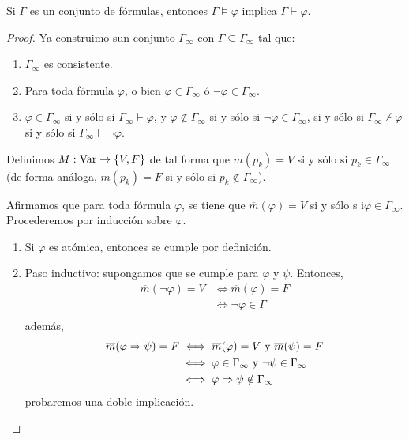 \documentclass[12pt]{report}
\theoremstyle{largebreak}
\newcommand\cf[3]{\ensuremath{#1:#2\rightarrow#3}}
\begin{document}
    \begin{cor}
        Si $\Gamma$ es un conjunto de fórmulas, entonces $\Gamma\vDash\varphi$ implica $\Gamma\vdash\varphi$. 
    \end{cor}

    \begin{proof}
        
        Ya construimo sun conjunto $\Gamma_\infty$ con $\Gamma\subseteq\Gamma_\infty$ tal que:
        \begin{enumerate}
            \item $\Gamma_\infty$ es consistente.
            \item Para toda fórmula $\varphi$, o bien $\varphi\in\Gamma_\infty$ ó $\neg\varphi\in\Gamma_\infty$.
            \item $\varphi\in\Gamma_\infty$ si y sólo si $\Gamma_\infty\vdash\varphi$, y $\varphi\notin\Gamma_\infty$ si y sólo si $\neg\varphi\in\Gamma_\infty$, si y sólo si $\Gamma_\infty\nvdash\varphi$ si y sólo si $\Gamma_\infty\vdash\neg\varphi$.
        \end{enumerate}

        Definimos $\cf{M}{\textup{Var}}{\left\{V,F\right\}}$ de tal forma que $m(p_k)=V$ si y sólo si $p_k\in\Gamma_\infty$ (de forma análoga, $m(p_k)=F$ si y sólo si $p_k\notin\Gamma_\infty$).

        Afirmamos que para toda fórmula $\varphi$, se tiene que $\overline{m}(\varphi)=V$ si y sólo s i$\varphi\in\Gamma_\infty$. Procederemos por inducción sobre $\varphi$.
        \begin{enumerate}
            \item Si $\varphi$ es atómica, entonces se cumple por definición.
            \item Paso inductivo: supongamos que se cumple para $\varphi$ y $\psi$. Entonces,
            \begin{equation*}
                \begin{split}
                    \overline{m}(\neg\varphi)=V&\iff \overline{m}(\varphi)=F\\
                    &\iff \neg\varphi\in\Gamma\\
                \end{split}
            \end{equation*}
            además,
            \begin{equation*}
                \begin{split}
                    \overline{m}(\varphi\Rightarrow\psi)=F&\iff\overline{m}(\varphi)=V\textup{ y } \overline{m}(\psi)=F\\
                    &\iff \varphi\in\Gamma_\infty\textup{ y } \neg\psi\in\Gamma_\infty\\
                    &\iff \varphi\Rightarrow\psi\notin \Gamma_\infty\\
                \end{split}
            \end{equation*}
            probaremos una doble implicación.
            

\end{enumerate}
\end{proof}
\end{document}

